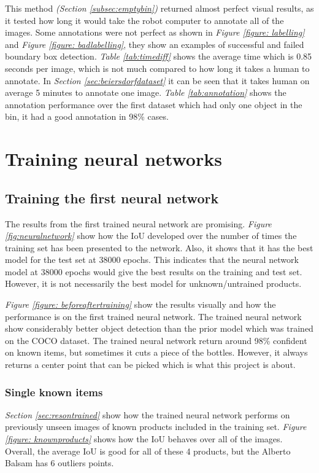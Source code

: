 This method \textit{(Section \ref{subsec:emptybin})} returned almost perfect visual results, as it tested how long it would take the robot computer to annotate all of the images. Some annotations were not perfect as shown in \textit{Figure \ref{figure: labelling}} and \textit{Figure \ref{figure: badlabelling}}, they show an examples of successful and failed boundary box detection.
\textit{Table \ref{tab:timediff}} shows the average time which is 0.85 seconds per image, which is not much compared to how long it takes a human to annotate. In \textit{Section \ref{sec:beiersdorfdataset}} it can be seen that it takes human on average 5 minutes to annotate one image. \textit{Table \ref{tab:annotation}} shows the annotation performance over the first dataset which had only one object in the bin, it had a good annotation in 98\% cases.



\section{Training neural networks} 
\subsection{Training the first neural network}
The results from the first trained neural network are promising. \textit{Figure \ref{fig:neuralnetwork}} show how the IoU developed over the number of times the training set has been presented to the network. Also, it shows that it has the best model for the test set at 38000 epochs. This indicates that the neural network model at 38000 epochs would give the best results on the training and test set. However, it is not necessarily the best model for unknown/untrained products.

\textit{Figure \ref{figure: beforeaftertraining}} show the results visually and how the performance is on the first trained neural network. The trained neural network show considerably better object detection than the prior model which was trained on the COCO dataset. The trained neural network return around 98\% confident on known items, but sometimes it cuts a piece of the bottles. However, it always returns a center point that can be picked which is what this project is about. 


\subsubsection{Single known items}
\textit{Section \ref{sec:resontrained}} show how the trained neural network performs on previously unseen images of known products included in the training set. \textit{Figure \ref{figure: knownproducts}} shows how the IoU behaves over all of the images. Overall, the average IoU is good for all of these 4 products, but the Alberto Balsam has 6 outliers points. %

